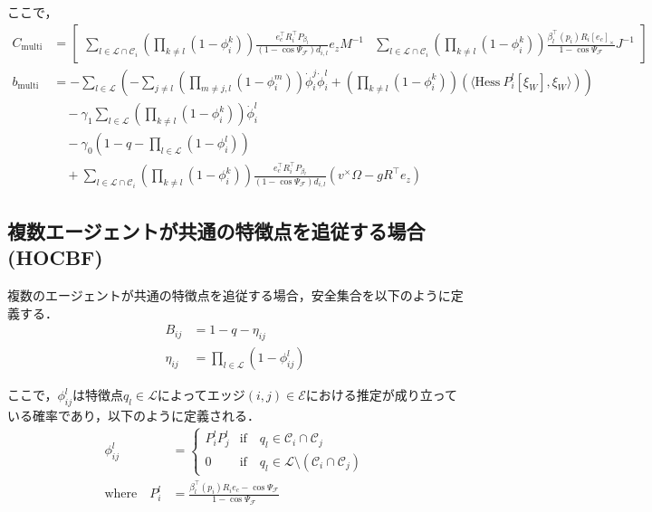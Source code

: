ここで，
\begin{equation}
\begin{aligned}
C_{\mathrm{multi}} &= \begin{bmatrix}
\sum_{l \in \mathcal{L} \cap \mathcal{C}_i} \left( \prod_{k \neq l} (1 - \phi_{i}^k) \right) \frac{e_c^\top R_i^\top P_{\beta_l}}{(1 - \cos \Psi_\mathcal{F}) d_{i,l}} e_z M^{-1} & \sum_{l \in \mathcal{L} \cap \mathcal{C}_i} \left( \prod_{k \neq l} (1 - \phi_{i}^k) \right) \frac{\beta_l^\top(p_i) R_i [e_c]_\times}{1 - \cos \Psi_\mathcal{F}} J^{-1}
\end{bmatrix} \\
b_{\mathrm{multi}} &= -\sum_{l \in \mathcal{L}} \left( -\sum_{j \neq l} \left( \prod_{m \neq j, l} (1 - \phi_{i}^m) \right) \dot{\phi}_i^j \dot{\phi}^l_{i} + \left( \prod_{k \neq l} (1 - \phi_{i}^k) \right) (\langle \mathrm{Hess}\:P_i^l[\xi_W], \xi_W \rangle) \right) \\
&\quad - \gamma_1 \sum_{l \in \mathcal{L}} \left( \prod_{k \neq l} (1 - \phi_{i}^k) \right) \dot{\phi}^l_{i} \\
&\quad - \gamma_0 (1 - q - \prod_{l \in \mathcal{L}} (1 - \phi_{i}^l)) \\
&\quad + \sum_{l \in \mathcal{L} \cap \mathcal{C}_i} \left( \prod_{k \neq l} (1 - \phi_{i}^k) \right) \frac{e_c^\top R_i^\top P_{\beta_l}}{(1 - \cos \Psi_\mathcal{F}) d_{i,l}} (v^\times \Omega - g R^\top e_z)
\label{eq:hocbf_qp_multi_parameters}
\end{aligned}
\end{equation}

\subsection{複数エージェントが共通の特徴点を追従する場合(HOCBF)}

複数のエージェントが共通の特徴点を追従する場合，安全集合を以下のように定義する．
\begin{equation}
\begin{aligned}
B_{ij} &= 1 - q - \eta_{ij} \\
\eta_{ij} &= \prod_{l \in \mathcal{L}} (1 - \phi_{ij}^l)
\label{eq:safe_set_edge_hocbf}
\end{aligned}
\end{equation}

ここで，$\phi_{ij}^l$は特徴点$q_l \in \mathcal{L}$によってエッジ$(i,j) \in \mathcal{E}$における推定が成り立っている確率であり，以下のように定義される．
\begin{equation}
\begin{aligned}
\phi_{ij}^l &= \left\{ \begin{array}{ll}
P_i^l P_j^l & \mathrm{if} \quad q_l \in \mathcal{C}_i \cap \mathcal{C}_j \\
0 & \mathrm{if} \quad q_l \in \mathcal{L} \setminus (\mathcal{C}_i \cap \mathcal{C}_j)
\end{array} \right. \\
\mathrm{where} \quad P_i^l &= \frac{\beta_l^\top(p_i) R_i e_c - \cos \Psi_\mathcal{F}}{1 - \cos \Psi_\mathcal{F}}
\label{eq:probability_edge_hocbf}
\end{aligned}
\end{equation}

